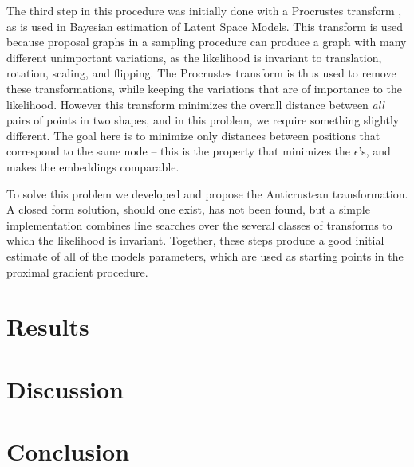\documentclass{article}
\begin{document}
The third step in this procedure was initially done with a Procrustes transform \cite{hoff}, as is used in Bayesian estimation of Latent Space Models. This transform is used because proposal graphs in a sampling procedure can produce a graph with many different unimportant variations, as the likelihood is invariant to translation, rotation, scaling, and flipping. The Procrustes transform is thus used to remove these transformations, while keeping the variations that are of importance to the likelihood. However this transform minimizes the overall distance between \textit{all} pairs of points in two shapes, and in this problem, we require something slightly different. The goal here is to minimize only distances between positions that correspond to the same node -- this is the property that minimizes the $\epsilon$'s, and makes the embeddings comparable.

To solve this problem we developed and propose the Anticrustean transformation. A closed form solution, should one exist, has not been found, but a simple implementation combines line searches over the several classes of transforms to which the likelihood is invariant. Together, these steps produce a good initial estimate of all of the models parameters, which are used as starting points in the proximal gradient procedure. 






\section{Results}

\lipsum[4]


\section{Discussion}



\section{Conclusion}

\lipsum[6]


\end{document}
